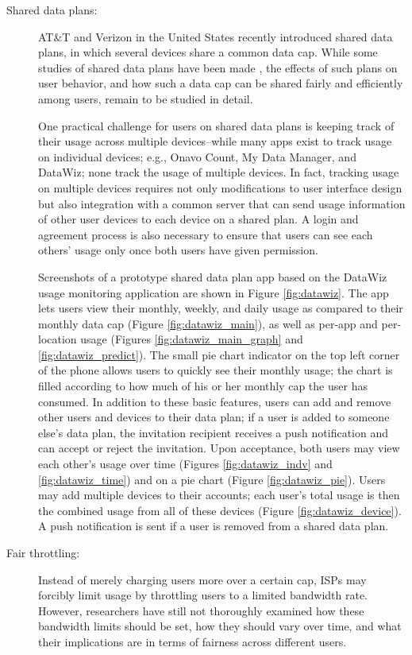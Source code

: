 \begin{description}
\item[Shared data plans:] AT\&T and Verizon in the United States recently introduced shared data plans, in which several devices share a common data cap. While some studies of shared data plans have been made \cite{WITS}, the effects of such plans on user behavior, and how such a data cap can be shared fairly and efficiently among users, remain to be studied in detail.

One practical challenge for users on shared data plans is keeping track of their usage across multiple devices--while many apps exist to track usage on individual devices; e.g., Onavo Count, My Data Manager, and DataWiz; none track the usage of multiple devices. In fact, tracking usage on multiple devices requires not only modifications to user interface design but also integration with a common server that can send usage information of other user devices to each device on a shared plan. A login and agreement process is also necessary to ensure that users can see each others' usage only once both users have given permission.

Screenshots of a prototype shared data plan app based on the DataWiz usage monitoring application are shown in Figure \ref{fig:datawiz}. The app lets users view their monthly, weekly, and daily usage as compared to their monthly data cap (Figure \ref{fig:datawiz_main}), as well as per-app and per-location usage (Figures \ref{fig:datawiz_main_graph} and \ref{fig:datawiz_predict}). The small pie chart indicator on the top left corner of the phone allows users to quickly see their monthly usage; the chart is filled according to how much of his or her monthly cap the user has consumed.
%
In addition to these basic features, users can add and remove other users and devices to their data plan; if a user is added to someone else's data plan, the invitation recipient receives a push notification and can accept or reject the invitation. Upon acceptance, both users may view each other's usage over time (Figures \ref{fig:datawiz_indv} and \ref{fig:datawiz_time}) and on a pie chart (Figure \ref{fig:datawiz_pie}). Users may add multiple devices to their accounts; each user's total usage is then the combined usage from all of these devices (Figure \ref{fig:datawiz_device}). A push notification is sent if a user is removed from a shared data plan.

\item[Fair throttling:] Instead of merely charging users more over a certain cap, ISPs may forcibly limit usage by throttling users to a limited bandwidth rate. However, researchers have still not thoroughly examined how these bandwidth limits should be set, how they should vary over time, and what their implications are in terms of fairness across different users.


\end{description}
